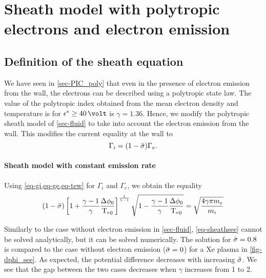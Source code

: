 
\section{Sheath model with polytropic electrons and electron emission}
\label{sec-fluid_poly_see}

\let\oldrightmark=\rightmark
\renewcommand\rightmark{\expandafter\MakeUppercase{Sheath with polytropic electron and SEE}}


\subsection{Definition of the sheath equation} \label{subsec-def_sheat_see}

We have seen in \cref{sec-PIC_poly} that even in the presence of electron emission from the wall, the electrons can be described using a polytropic state law.
The value of the polytropic index obtained from the mean electron density and temperature is for $\crover \geq 40 \,\volt$ is $\gamma = 1.36$.
Hence, we modify the polytropic sheath model of \cref{sec-fluid} to take into account the electron emission from the wall.
This modifies the current equality at the wall to
\begin{equation} \label{eq-see-J_eq}
  \Gamma_i = (1 -  \bar{\sigma }) \Gamma_e.
\end{equation}

\paragraph{Sheath model with constant emission rate\\}

Using \cref{eq-gi,eq-ge,eq-tew} for $\Gamma_i$ and $\Gamma_e$, we obtain the equality
\begin{equation}\label{eq-sheathsee}
  (1 -  \bar{\sigma } )\left[ 1 +\frac{\gamma -1}{\gamma} \frac{ \Delta \phi_0}{ \mathrm{T_e}_0}  \right]^{\frac{1}{\gamma - 1}} \sqrt{1 - \frac{\gamma -1}{\gamma}\frac{\Delta \phi_0}{\mathrm{T_e}_0}} = \sqrt{\frac{4 \gamma \pi m_e}{m_i}}
\end{equation}

Similarly to the case without electron emission in \cref{sec-fluid}, \cref{eq-sheathsee} cannot be solved analytically, but it can be solved numerically.
The solution for $ \bar{\sigma }=0.8$ is compared to the case without electron emission ($ \bar{\sigma }=0$) for a \ac{Xe} plasma in \cref{fig-dphi_see}.
As expected, the potential difference decreases with increasing $ \bar{\sigma }$.
We see that the gap between the two cases decreases when $\gamma$ increases from 1 to 2.

